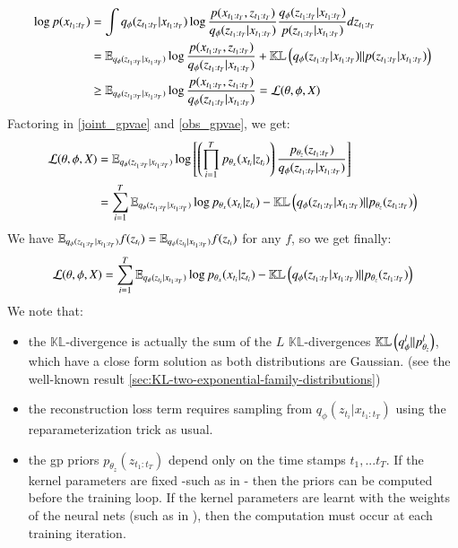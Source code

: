 \begin{align}
    \log{p(x_{t_1:t_T})} &= \int q_{\phi}(z_{t_1:t_T} \vert x_{t_1:t_T}) \log{\frac{p(x_{t_1:t_T}, z_{t_1:t_T})}{q_{\phi}(z_{t_1:t_T}\vert x_{t_1:t_T})}\frac{q_{\phi}(z_{t_1:t_T}\vert x_{t_1:t_T})}{p(z_{t_1:t_T} \vert x_{t_1:t_T})}} dz_{t_1:t_T} \\
    &= \mathbb{E}_{q_{\phi}(z_{t_1:t_T} \vert x_{t_1:t_T})} \log{\frac{p(x_{t_1:t_T}, z_{t_1:t_T})}{q_{\phi}(z_{t_1:t_T} \vert x_{t_1:t_T})}} + \mathbb{KL}\left( q_{\phi}(z_{t_1:t_T} \vert x_{t_1:t_T}) \vert\vert p(z_{t_1:t_T} \vert x_{t_1:t_T}) \right) \\
    &\geq \mathbb{E}_{q_{\phi}(z_{t_1:t_T} \vert x_{t_1:t_T})} \log{\frac{p(x_{t_1:t_T}, z_{t_1:t_T})}{q_{\phi}(z_{t_1:t_T} \vert x_{t_1:t_T})}} = \mathcal{L}(\theta, \phi, X)
\end{align}
Factoring in \ref{joint_gpvae} and \ref{obs_gpvae}, we get:
\begin{align}
    \mathcal{L}(\theta, \phi, X) &= \mathbb{E}_{q_{\phi}(z_{t_1:t_T} \vert x_{t_1:t_T})} \log{\left[ \left( \prod_{i=1}^T p_{\theta_x}(x_{t_i} \vert z_{t_i}) \right) \frac{p_{\theta_z}(z_{t_1:t_T})}{q_{\phi}(z_{t_1:t_T} \vert x_{t_1:t_T})}
    \right]} \\
    &= \sum_{i=1}^T \mathbb{E}_{q_{\phi}(z_{t_1:t_T} \vert x_{t_1:t_T})} \log{p_{\theta_x}(x_{t_i} \vert z_{t_i})} - \mathbb{KL}\left( q_{\phi}(z_{t_1:t_T} \vert x_{t_1:t_T}) \vert\vert p_{\theta_z}(z_{t_1:t_T}) \right)
\end{align}
We have $\mathbb{E}_{q_{\phi}(z_{t_1:t_T} \vert x_{t_1:t_T})} f(z_{t_i}) = \mathbb{E}_{q_{\phi}(z_{t_i} \vert x_{t_1:t_T})} f(z_{t_i})$ for any $f$, so we get finally:
\begin{align}
    \mathcal{L}(\theta, \phi, X) = \sum_{i=1}^T \mathbb{E}_{q_{\phi}(z_{t_i} \vert x_{t_1:t_T})} \log{p_{\theta_x}(x_{t_i} \vert z_{t_i})} - \mathbb{KL}\left( q_{\phi}(z_{t_1:t_T} \vert x_{t_1:t_T}) \vert\vert p_{\theta_z}(z_{t_1:t_T}) \right)
\end{align}
We note that:
\begin{itemize}
    \item the $\mathbb{KL}$-divergence is actually the sum of the $L$ $\mathbb{KL}$-divergences $\mathbb{KL}\left( q_{\phi}^l \vert\vert p_{\theta_z}^l \right)$, which have a close form solution as both distributions are Gaussian. (see the well-known result \ref{sec:KL-two-exponential-family-distributions})
    \item the reconstruction loss term requires sampling from $q_{\phi}(z_{t_i} \vert x_{t_1:t_T})$ using the reparameterization trick as usual.
    \item the \gls{gp} priors $p_{\theta_z}(z_{t_1:t_T})$ depend only on the time stamps $t_1,...t_T$. If the kernel parameters are fixed -such as in \cite{fortuin_gp-vae:_2020}- then the priors can be computed before the training loop. If the kernel parameters are learnt with the weights of the neural nets (such as in \cite{zhu_markovian_2023}), then the computation must occur at each training iteration.
\end{itemize}

